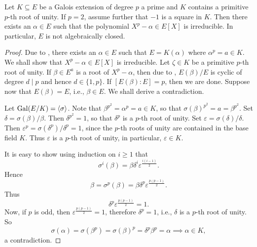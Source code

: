 \begin{theorem}
    Let $K\subseteq E$ be a Galois extension of degree $p$ a prime and $K$ contains a primitive $p$-th root of unity. If $p = 2$, assume further that $-1$ is a square in $K$. Then there exists an $\alpha\in E$ such that the polynomial $X^p - \alpha\in E[X]$ is irreducible. In particular, $E$ is not algebraically closed.
\end{theorem}
\begin{proof}
    Due to , there exists an $\alpha\in E$ such that $E = K(\alpha)$ where $\alpha^p = a\in K$. We shall show that $X^p - \alpha\in E[X]$ is irreducible. Let $\zeta\in K$ be a primitive $p$-th root of unity. If $\beta\in E^a$ is a root of $X^p - \alpha$, then due to , $E(\beta)/E$ is cyclic of degree $d\mid p$ and hence $d\in\{1, p\}$. If $[E(\beta) : E] = p$, then we are done. Suppose now that $E(\beta) = E$, i.e., $\beta\in E$. We shall derive a contradiction. 

    Let $\operatorname{Gal}(E/K) = \langle\sigma\rangle$. Note that $\beta^{p^2} = \alpha^p = a \in K$, so that $\sigma(\beta)^{p^2} = a = \beta^{p^2}$. Set $\delta = \sigma(\beta)/\beta$. Then $\delta^{p^2} = 1$, so that $\delta^p$ is a $p$-th root of unity. Set $\varepsilon = \sigma(\delta)/\delta$. Then $\varepsilon^p = \sigma(\delta^p)/\delta^p = 1$, since the $p$-th roots of unity are contained in the base field $K$. Thus $\varepsilon$ is a $p$-th root of unity, in particular, $\varepsilon\in K$.

    It is easy to show using induction on $i\ge 1$ that 
    \begin{equation*}
        \sigma^i(\beta) = \beta\delta^i\varepsilon^{\frac{i(i - 1)}{2}}.
    \end{equation*}
    Hence 
    \begin{equation*}
        \beta = \sigma^p(\beta) = \beta\delta^p\varepsilon^{\frac{p(p - 1)}{2}}.
    \end{equation*}
    Thus 
    \begin{equation*}
        \delta^p\varepsilon^{\frac{p(p - 1)}{2}} = 1.
    \end{equation*}
    Now, if $p$ is odd, then $\varepsilon^{\frac{p(p - 1)}{2}} = 1$, therefore $\delta^p = 1$, i.e., $\delta$ is a $p$-th root of unity. So 
    \begin{equation*}
        \sigma(\alpha) = \sigma(\beta^p) = \sigma(\beta)^p = \delta^p\beta^p = \alpha\implies\alpha\in K, 
    \end{equation*}
    a contradiction.


\end{proof}
